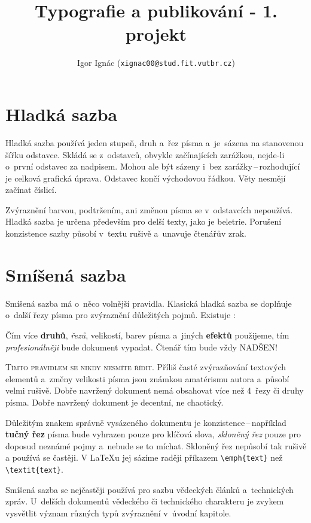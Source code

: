 \documentclass[a4paper, twocolumn, 10pt]{article}
\title{Typografie a publikování - 1. projekt}
\author{Igor Ignác (\texttt{xignac00@stud.fit.vutbr.cz})}
\date{}
\begin{document}
\maketitle

\section{Hladká sazba}
\label{sec:smooth}

Hladká sazba používá jeden stupeň, druh a~řez písma a~je~sázena na stanovenou šířku odstavce. Skládá se z~odstavců, obvykle začínajících zarážkou, nejde-li o~první odstavec za nadpisem. Mohou ale být sázeny i~bez zarážky\,--\,rozhodující je celková grafická úprava. Odstavec končí východovou řádkou. Věty nesmějí začínat číslicí.
\par
Zvýraznění barvou, podtržením, ani změnou písma se v~odstavcích nepoužívá. Hladká sazba je určena především pro delší texty, jako je beletrie. Porušení konzistence sazby působí v~textu rušivě a~unavuje čtenářův zrak.

\section{Smíšená sazba}
\label{sec:mixed}

Smíšená sazba má o~něco volnější pravidla. Klasická hladká sazba se doplňuje o~další řezy písma pro zvýraznění důležitých pojmů. Existuje :

\begin{displayquote}

Čím více \textbf{druhů}, \textit{řezů}, {\footnotesize velikostí}, barev písma a~jiných{ \tiny \textbf{efektů}} použijeme, tím \emph{profesionálněji} bude dokument vypadat. Čtenář tím bude{ \LARGE vždy}{ \huge NADŠEN!}
\end{displayquote}

\textsc{Tímto pravidlem se nikdy nesmíte řídit.} Příliš časté zvýrazňování textových elementů a~změny velikosti písma jsou známkou amatérismu autora a~působí velmi rušivě. Dobře navržený dokument nemá obsahovat více než
4~řezy či druhy písma. Dobře navržený dokument je decentní, ne chaotický.
\par
Důležitým znakem správně vysázeného dokumentu je konzistence\,--\,například \textbf{tučný řez} písma bude vyhrazen pouze pro klíčová slova, \emph{skloněný řez} pouze pro doposud neznámé pojmy a~nebude se to míchat. Skloněný řez nepůsobí tak rušivě a používá se častěji. V \LaTeX u jej sázíme raději příkazem \verb|\emph{text}| než \verb|\textit{text}|.
\par
Smíšená sazba se nejčastěji používá pro sazbu vědeckých článků a~technických zpráv. U~delších dokumentů vědeckého či technického charakteru je zvykem vysvětlit význam různých typů zvýraznění v~úvodní kapitole.
\end{document}
